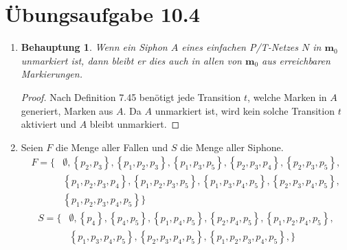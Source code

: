 \documentclass[a4paper]{scrartcl}
\newtheorem*{behaupt}{Behauptung}
\begin{document}
\clearpage

\section*{Übungsaufgabe 10.4} 
\begin{enumerate}
    \item
        \begin{behaupt}
            Wenn ein Siphon $A$ eines einfachen P/T-Netzes $N$ in $\textbf{m}_0$
            unmarkiert ist, dann bleibt er dies auch in allen von $\textbf{m}_0$
            aus erreichbaren Markierungen.
        \end{behaupt}
        \begin{proof}
            Nach Definition 7.45 benötigt jede Transition $t$, welche Marken in
            $A$ generiert, Marken aus $A$.
            Da $A$ unmarkiert ist, wird kein solche Transition $t$ aktiviert und
            $A$ bleibt unmarkiert.
        \end{proof}

    \item
        Seien $F$ die Menge aller Fallen und $S$ die Menge aller Siphone.
        \begin{equation}
            \begin{split}
                F = \Big\{
                    & \emptyset,
                    \left\{ p_2, p_3 \right\},
                    \left\{ p_1, p_2, p_3 \right\},
                    \left\{ p_1, p_3, p_5 \right\},
                    \left\{ p_2, p_3, p_4 \right\},
                    \left\{ p_2, p_3, p_5 \right\}, \\
                    & \left\{ p_1, p_2, p_3, p_4 \right\},
                    \left\{ p_1, p_2, p_3, p_5 \right\},
                    \left\{ p_1, p_3, p_4, p_5 \right\},
                    \left\{ p_2, p_3, p_4, p_5 \right\}, \\
                    & \left\{ p_1, p_2, p_3, p_4, p_5 \right\}
                \Big\}
            \end{split}
        \end{equation}
        \begin{equation}
            \begin{split}
                S = \Big\{
                    & \emptyset,
                    \left\{ p_4 \right\},
                    \left\{ p_4, p_5 \right\},
                    \left\{ p_1, p_4, p_5 \right\},
                    \left\{ p_2, p_4, p_5 \right\},
                    \left\{ p_1, p_2, p_4, p_5 \right\}, \\
                    & \left\{ p_1, p_3, p_4, p_5 \right\},
                    \left\{ p_2, p_3, p_4, p_5 \right\},
                    \left\{ p_1, p_2, p_3, p_4, p_5 \right\},
                \Big\}
            \end{split}
        \end{equation}


\end{enumerate}
\end{document}
